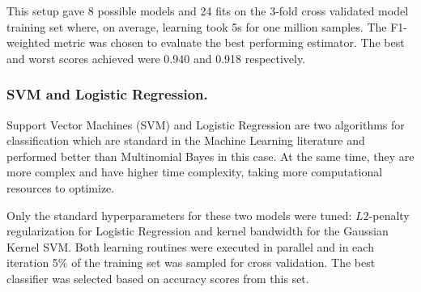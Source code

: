  This setup gave 8 possible models and 24 fits on the 3-fold cross validated model training set where, on average, learning took 5s for one million samples. The F1-weighted metric was chosen to evaluate the best performing estimator.
The best and worst scores achieved were 0.940 and 0.918 respectively. 



\subsubsection{SVM and Logistic Regression.}

Support Vector Machines (SVM) and Logistic Regression are two algorithms for classification which are standard in the Machine Learning literature and performed better than Multinomial Bayes in this case. 
At the same time, they are more complex and have higher time complexity, taking more computational resources to optimize.

Only the standard hyperparameters for these two models were tuned: $L2$-penalty regularization for Logistic Regression and kernel bandwidth for the Gaussian Kernel SVM.
Both learning routines were executed in parallel and in each iteration 5\% of the training set was sampled for cross validation. The best classifier was selected based on accuracy scores from this set.



